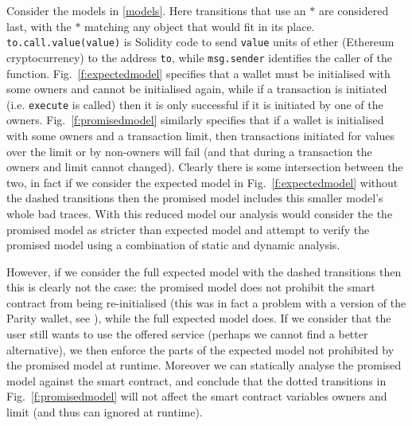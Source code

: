 %

Consider the models in \ref{models}. Here transitions that use an $*$ are considered last, with the $*$ matching any object that would fit in its place. \texttt{to.call.value(value)} is Solidity code to send \texttt{value} units of ether (Ethereum cryptocurrency) to the address \texttt{to}, while \texttt{msg.sender} identifies the caller of the function. Fig.~\ref{f:expectedmodel} specifies that a wallet must be initialised with some owners and cannot be initialised again, while if a transaction is initiated (i.e. \texttt{execute} is called) then it is only successful if it is initiated by one of the owners. Fig.~\ref{f:promisedmodel} similarly specifies that if a wallet is initialised with some owners and a transaction limit, then transactions initiated for values over the limit or by non-owners will fail (and that during a transaction the owners and limit cannot changed). Clearly there is some intersection between the two, in fact if we consider the expected model in Fig.~\ref{f:expectedmodel} without the dashed transitions then the promised model includes this smaller model's whole bad traces. With this reduced model our analysis would consider the the promised model as stricter than expected model and attempt to verify the promised model using a combination of static and dynamic analysis.

However, if we consider the full expected model with the dashed transitions then this is clearly not the case: the promised model does not prohibit the smart contract from being re-initialised (this was in fact a problem with a version of the Parity wallet, see \cite{multisighack}), while the full expected model does. If we consider that the user still wants to use the offered service (perhaps we cannot find a better alternative), we then enforce the parts of the expected model not prohibited by the promised model at runtime. Moreover we can statically analyse the promised model against the smart contract, and conclude that the dotted transitions in Fig.~\ref{f:promisedmodel} will not affect the smart contract variables owners and limit (and thus can ignored at runtime). %


